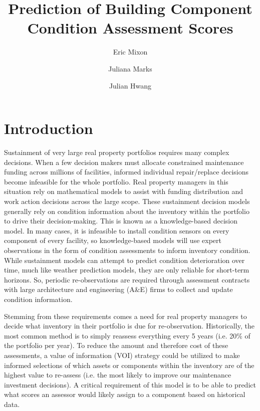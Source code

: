 \documentclass[NewProceedings,letterpaper,NoPageNumbers,NoLineNumbers, DoubleSpace]{ascelike-new}
\begin{document}
\title{Prediction of Building Component Condition Assessment Scores}

\author[1]{Eric Mixon}
\author[2]{Juliana Marks}
\author[3]{Julian Hwang}

\maketitle

\section{Introduction}

Sustainment of very large real property portfolios requires many complex decisions. When a few decision makers must allocate constrained maintenance funding across millions of facilities, informed individual repair/replace decisions become infeasible for the whole portfolio. Real property managers in this situation rely on mathematical models to assist with funding distribution and work action decisions across the large scope.  These sustainment decision models generally rely on condition information about the inventory within the portfolio to drive their decision-making. This is known as a knowledge-based decision model.  In many cases, it is infeasible to install condition sensors on every component of every facility, so knowledge-based models will use expert observations in the form of condition assessments to inform inventory condition.  While sustainment models can attempt to predict condition deterioration over time, much like weather prediction models, they are only reliable for short-term horizons. So, periodic re-observations are required through assessment contracts with large architecture and engineering (A\&E) firms to collect and update condition information.  

Stemming from these requirements comes a need for real property managers to decide what inventory in their portfolio is due for re-observation.  Historically, the most common method is to simply reassess everything every 5 years (i.e. 20\% of the portfolio per year).  To reduce the amount and therefore cost of these assessments, a value of information (VOI) strategy could be utilized to make informed selections of which assets or components within the inventory are of the highest value to re-assess (i.e. the most likely to improve our maintenance investment decisions).  A critical requirement of this model is to be able to predict what scores an assessor would likely assign to a component based on historical data. 
\end{document}

